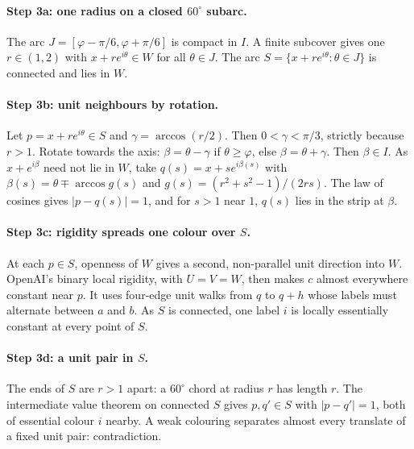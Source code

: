 \documentclass[11pt]{article}
\theoremstyle{definition}
\theoremstyle{remark}
\begin{document}
\paragraph{Step 3a: one radius on a closed $60^\circ$ subarc.} The arc
$J=[\varphi-\pi/6,\varphi+\pi/6]$ is compact in $I$. A finite subcover
gives one $r\in(1,2)$ with $x+re^{i\theta}\in W$ for all $\theta\in J$. The
arc $S=\{x+re^{i\theta}:\theta\in J\}$ is connected and lies in $W$.

\paragraph{Step 3b: unit neighbours by rotation.} Let $p=x+re^{i\theta}\in S$
and $\gamma=\arccos(r/2)$. Then $0<\gamma<\pi/3$, strictly because $r>1$.
Rotate towards the axis: $\beta=\theta-\gamma$ if $\theta\ge\varphi$, else
$\beta=\theta+\gamma$. Then $\beta\in I$. As $x+e^{i\beta}$ need not lie in
$W$, take $q(s)=x+se^{i\beta(s)}$ with $\beta(s)=\theta\mp\arccos g(s)$ and
$g(s)=(r^2+s^2-1)/(2rs)$. The law of cosines gives $|p-q(s)|=1$, and for
$s>1$ near $1$, $q(s)$ lies in the strip at $\beta$.

\paragraph{Step 3c: rigidity spreads one colour over $S$.} At each $p\in S$,
openness of $W$ gives a second, non-parallel unit direction into $W$.
OpenAI's binary local rigidity, with $U=V=W$, then makes $c$ almost
everywhere constant near $p$. It uses four-edge unit walks from $q$ to $q+h$
whose labels must alternate between $a$ and $b$. As $S$ is connected, one
label $i$ is locally essentially constant at every point of $S$.

\paragraph{Step 3d: a unit pair in $S$.} The ends of $S$ are $r>1$ apart:
a $60^\circ$ chord at radius $r$ has length $r$. The intermediate value
theorem on connected $S$ gives $p,q'\in S$ with $|p-q'|=1$, both of
essential colour $i$ nearby. A weak colouring separates almost every
translate of a fixed unit pair: contradiction.
\end{document}
